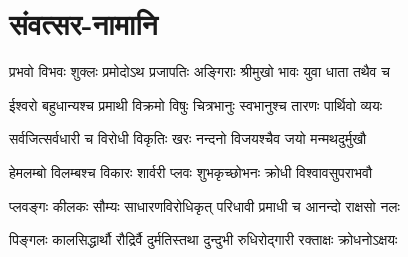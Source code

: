 \section{संवत्सर-नामानि}
\label{app:samvatsara_names}

\twolineshloka
{प्रभवो विभवः शुक्लः प्रमोदोऽथ प्रजापतिः}
{अङ्गिराः श्रीमुखो भावः युवा धाता तथैव च}

\twolineshloka
{ईश्वरो बहुधान्यश्च प्रमाथी विक्रमो विषुः}
{चित्रभानुः स्वभानुश्च तारणः पार्थिवो व्ययः}

\twolineshloka
{सर्वजित्सर्वधारी च विरोधी विकृतिः खरः}
{नन्दनो विजयश्चैव जयो मन्मथदुर्मुखौ}

\twolineshloka
{हेमलम्बो विलम्बश्च विकारः शार्वरी प्लवः}
{शुभकृच्छोभनः क्रोधी विश्वावसुपराभवौ}

\twolineshloka
{प्लवङ्गः कीलकः सौम्यः साधारणविरोधिकृत्}
{परिधावी प्रमाधी च आनन्दो राक्षसो नलः}

\twolineshloka
{पिङ्गलः कालसिद्धार्थौ रौद्रिर्वै दुर्मतिस्तथा}
{दुन्दुभी रुधिरोद्गारी रक्ताक्षः क्रोधनोऽक्षयः}

